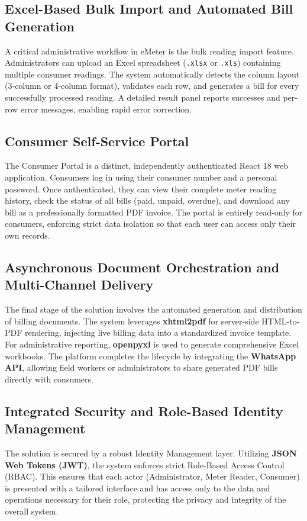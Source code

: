 \documentclass[12pt, a4paper, onecolumn]{report}
\begin{document}
\subsection{Excel-Based Bulk Import and Automated Bill Generation}
A critical administrative workflow in eMeter is the bulk reading import feature. Administrators can upload an Excel spreadsheet (\texttt{.xlsx} or \texttt{.xls}) containing multiple consumer readings. The system automatically detects the column layout (3-column or 4-column format), validates each row, and generates a bill for every successfully processed reading. A detailed result panel reports successes and per-row error messages, enabling rapid error correction.

\subsection{Consumer Self-Service Portal}
The Consumer Portal is a distinct, independently authenticated React 18 web application. Consumers log in using their consumer number and a personal password. Once authenticated, they can view their complete meter reading history, check the status of all bills (paid, unpaid, overdue), and download any bill as a professionally formatted PDF invoice. The portal is entirely read-only for consumers, enforcing strict data isolation so that each user can access only their own records.

\subsection{Asynchronous Document Orchestration and Multi-Channel Delivery}
The final stage of the solution involves the automated generation and distribution of billing documents. The system leverages \textbf{xhtml2pdf} for server-side HTML-to-PDF rendering, injecting live billing data into a standardized invoice template. For administrative reporting, \textbf{openpyxl} is used to generate comprehensive Excel workbooks. The platform completes the lifecycle by integrating the \textbf{WhatsApp API}, allowing field workers or administrators to share generated PDF bills directly with consumers.

\subsection{Integrated Security and Role-Based Identity Management}
The solution is secured by a robust Identity Management layer. Utilizing \textbf{JSON Web Tokens (JWT)}, the system enforces strict Role-Based Access Control (RBAC). This ensures that each actor (Administrator, Meter Reader, Consumer) is presented with a tailored interface and has access only to the data and operations necessary for their role, protecting the privacy and integrity of the overall system.
\end{document}
